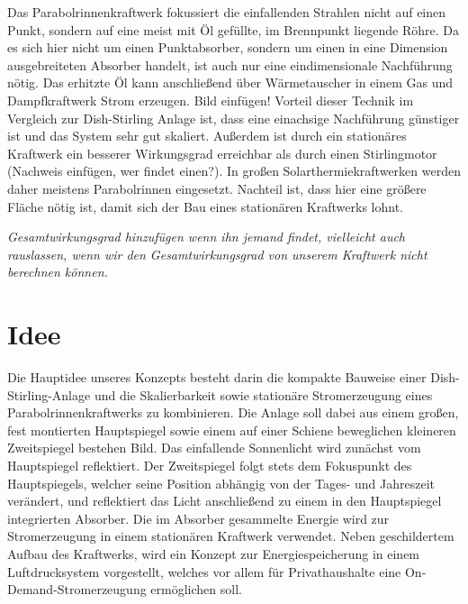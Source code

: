 \documentclass[fontsize=10pt,paper=a4,bibliography=totoc]{scrartcl}
\newcommand{\maxim}[1]{{ \color{blue} #1}}
\newcommand{\todo}[1]{{\color{magenta}#1}}
\begin{document}
Das Parabolrinnenkraftwerk fokussiert die einfallenden Strahlen nicht auf einen Punkt, sondern auf eine meist mit Öl gefüllte, im Brennpunkt liegende Röhre. Da es sich hier nicht um einen Punktabsorber, sondern um einen in eine Dimension ausgebreiteten Absorber handelt, ist auch nur eine eindimensionale Nachführung nötig. Das erhitzte Öl kann anschließend über Wärmetauscher in einem Gas und Dampfkraftwerk Strom erzeugen. Bild einfügen! Vorteil dieser Technik im Vergleich zur Dish-Stirling Anlage ist, dass eine einachsige Nachführung günstiger ist und das System sehr gut skaliert. Außerdem ist durch ein stationäres Kraftwerk ein besserer Wirkungsgrad erreichbar als durch einen Stirlingmotor
 (Nachweis einfügen, wer findet einen?). In großen Solarthermiekraftwerken werden daher meistens Parabolrinnen eingesetzt. Nachteil ist, dass hier eine größere Fläche nötig ist, damit sich der Bau eines stationären Kraftwerks lohnt.

\emph{Gesamtwirkungsgrad hinzufügen wenn ihn jemand findet, vielleicht auch rauslassen, wenn wir den Gesamtwirkungsgrad von unserem Kraftwerk nicht berechnen können.}

\section{Idee}


\maxim{
Die Hauptidee unseres Konzepts besteht darin die kompakte Bauweise einer Dish-Stirling-Anlage und die Skalierbarkeit sowie stationäre Stromerzeugung eines Parabolrinnenkraftwerks zu kombinieren. Die Anlage soll dabei aus einem großen, fest montierten Hauptspiegel sowie einem auf einer Schiene beweglichen kleineren Zweitspiegel bestehen \todo{Bild}. Das einfallende Sonnenlicht wird zunächst vom Hauptspiegel reflektiert. Der Zweitspiegel folgt stets dem Fokuspunkt des Hauptspiegels, welcher seine Position abhängig von der Tages- und Jahreszeit verändert, und reflektiert das Licht anschließend zu einem in den Hauptspiegel integrierten Absorber.  Die im Absorber gesammelte Energie wird zur Stromerzeugung in einem stationären Kraftwerk verwendet.
\hfill\newline
\hfill\newline
Neben geschildertem Aufbau des Kraftwerks, wird ein Konzept zur Energiespeicherung in einem Luftdrucksystem vorgestellt, welches vor allem für Privathaushalte eine On-Demand-Stromerzeugung ermöglichen soll.
}
\hfill \newline
\end{document}
